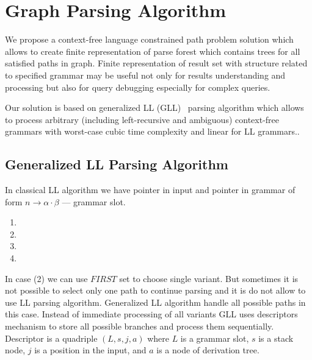 \section{Graph Parsing Algorithm}

We propose a context-free language constrained path problem solution which allows to create finite representation of parse forest which contains trees for all satisfied paths in graph.
Finite representation of result set with structure related to specified grammar may be useful not only for results understanding and processing but also for query debugging especially for complex queries. 

Our solution is based on generalized LL (GLL)~\cite{scott2010gll, FastPracticalGLL} parsing algorithm which allows to process arbitrary (including left-recursive and ambiguous) context-free grammars with worst-case cubic time complexity and linear for LL grammars..


\subsection{Generalized LL Parsing Algorithm}

In classical LL algorithm we have pointer in input and pointer in grammar of form $n \rightarrow \alpha \cdot \beta $ --- grammar slot. 

\begin{enumerate}
\item 
\item
\item
\item
\end{enumerate}

In case (2) we can use $FIRST$ set to choose single variant. 
But sometimes it is not possible to select only one path to continue parsing and it is do not allow to use LL parsing algorithm.
Generalized LL algorithm handle all possible paths in this case. 
Instead of immediate processing of all variants GLL uses descriptors mechanism to store all possible branches and process them sequentially. 
Descriptor is a quadriple $(L, s, j, a)$ where $L$ is a grammar slot, $s$ is a stack node, $j$ is a position in the input, and $a$ is a node of derivation tree. 

